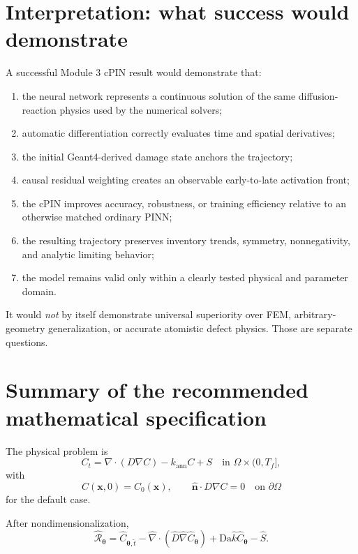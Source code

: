 \documentclass[11pt]{article}
\newcommand{\thetav}{\bm{\theta}}
\newcommand{\xv}{\bm{x}}
\newcommand{\Om}{\Omega}
\newcommand{\Da}{\mathrm{Da}}
\begin{document}
\section{Interpretation: what success would demonstrate}

A successful Module 3 cPIN result would demonstrate that:
\begin{enumerate}[label=\arabic*.]
    \item the neural network represents a continuous solution of the same diffusion-reaction physics used by the numerical solvers;
    \item automatic differentiation correctly evaluates time and spatial derivatives;
    \item the initial Geant4-derived damage state anchors the trajectory;
    \item causal residual weighting creates an observable early-to-late activation front;
    \item the cPIN improves accuracy, robustness, or training efficiency relative to an otherwise matched ordinary PINN;
    \item the resulting trajectory preserves inventory trends, symmetry, nonnegativity, and analytic limiting behavior;
    \item the model remains valid only within a clearly tested physical and parameter domain.
\end{enumerate}

It would \emph{not} by itself demonstrate universal superiority over FEM, arbitrary-geometry generalization, or accurate atomistic defect physics. Those are separate questions.

\section{Summary of the recommended mathematical specification}

The physical problem is
\begin{equation}
C_t
=
\nabla\cdot(D\nabla C)-k_{\mathrm{ann}}C+S
\quad\text{in }\Om\times(0,T_f],
\end{equation}
with
\begin{equation}
C(\xv,0)=C_0(\xv),
\qquad
\hat{\mathbf n}\cdot D\nabla C=0
\quad\text{on }\partial\Om
\end{equation}
for the default case.

After nondimensionalization,
\begin{equation}
\widehat{\mathcal R}_{\thetav}
=
\widehat{C}_{\thetav,\hat t}
-\hat\nabla\cdot
(\hat D\hat\nabla\widehat C_{\thetav})
+\Da\hat k\widehat C_{\thetav}
-\hat S.
\end{equation}
\end{document}
